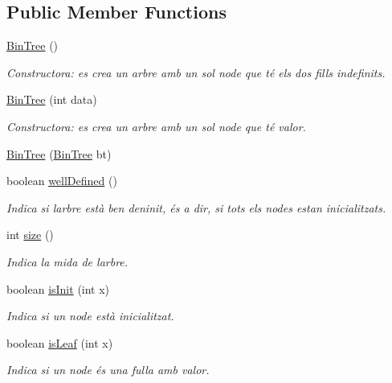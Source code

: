 \subsection*{Public Member Functions}
\begin{DoxyCompactItemize}
\item 
\hyperlink{classdomini_1_1utils_1_1BinTree_a46082da82a1186c5a99ae68eee6ece13}{Bin\+Tree} ()
\begin{DoxyCompactList}\small\item\em Constructora\+: es crea un arbre amb un sol node que té els dos fills indefinits. \end{DoxyCompactList}\item 
\hyperlink{classdomini_1_1utils_1_1BinTree_a83904c6ebf931ba29a134be5f29a66c7}{Bin\+Tree} (int data)
\begin{DoxyCompactList}\small\item\em Constructora\+: es crea un arbre amb un sol node que té valor. \end{DoxyCompactList}\item 
\hyperlink{classdomini_1_1utils_1_1BinTree_a27e66345747234352bf37b604519001a}{Bin\+Tree} (\hyperlink{classdomini_1_1utils_1_1BinTree}{Bin\+Tree} bt)
\item 
boolean \hyperlink{classdomini_1_1utils_1_1BinTree_a30f097b37ebea20379d9c2930e8fa27f}{well\+Defined} ()
\begin{DoxyCompactList}\small\item\em Indica si l\textquotesingle{}arbre està ben deninit, és a dir, si tots els nodes estan inicialitzats. \end{DoxyCompactList}\item 
int \hyperlink{classdomini_1_1utils_1_1BinTree_afb98cb560c437784fe3ce1b8d6aa046e}{size} ()
\begin{DoxyCompactList}\small\item\em Indica la mida de l\textquotesingle{}arbre. \end{DoxyCompactList}\item 
boolean \hyperlink{classdomini_1_1utils_1_1BinTree_aefcc4df5059f9893eba9998cb267eced}{is\+Init} (int x)
\begin{DoxyCompactList}\small\item\em Indica si un node està inicialitzat. \end{DoxyCompactList}\item 
boolean \hyperlink{classdomini_1_1utils_1_1BinTree_a37030e961f5613a5c74984ac002d965b}{is\+Leaf} (int x)
\begin{DoxyCompactList}\small\item\em Indica si un node és una fulla amb valor. \end{DoxyCompactList}\item 

\end{DoxyCompactItemize}
